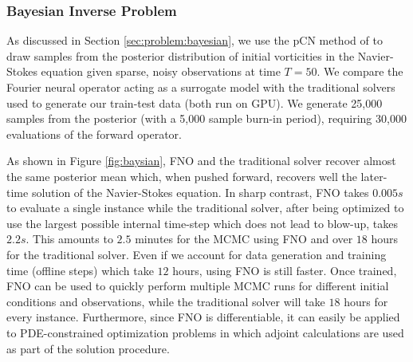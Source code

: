 
\subsubsection{Bayesian Inverse Problem}
\label{sec:bayesian}
As discussed in Section \ref{sec:problem:bayesian},
we use the pCN method of \cite{Cotter_2013} to draw samples from the posterior distribution of initial vorticities in the Navier-Stokes equation given sparse, noisy observations at time $T=50$. We compare the Fourier neural operator acting as a surrogate model with the traditional solvers used to generate our train-test data (both run on GPU). We generate 25,000 samples from the posterior (with a 5,000 sample burn-in period), requiring 30,000 evaluations of the forward operator.

As shown in Figure \ref{fig:baysian}, FNO and the traditional solver recover almost the same posterior mean which, when pushed forward, recovers well the later-time solution of the Navier-Stokes equation.
In sharp contrast, FNO takes $0.005s$ to evaluate a single instance while the traditional solver, after being optimized to use the largest possible internal time-step which does not lead to blow-up, takes $2.2s$. This amounts to $2.5$ minutes for the MCMC using FNO and over $18$ hours for the traditional solver. Even if we account for data generation and training time (offline steps) which take $12$ hours, using FNO is still faster. Once trained, FNO can be used to quickly perform multiple MCMC runs for different initial conditions and observations, while the traditional solver will take $18$ hours for every instance. Furthermore, since FNO is differentiable, it can easily be applied to PDE-constrained optimization problems in which
adjoint calculations are used as part of the solution procedure.


